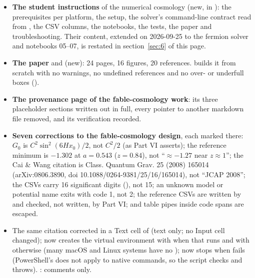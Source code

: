 \begin{itemize}
  \item \textbf{The student instructions} of the numerical cosmology (new, in ): the prerequisites per platform, the setup, the solver's command-line contract read from , the CSV columns, the notebooks, the tests, the paper and troubleshooting. Their content, extended on 2026-09-25 to the fermion solver and notebooks 05--07, is restated in section~\ref{sec:6} of this page.
  \item \textbf{The paper}  and  (new): 24 pages, 16 figures, 20 references.  builds it from scratch with no warnings, no undefined references and no over- or underfull boxes ().
  \item \textbf{The provenance page of the fable-cosmology work}: its three placeholder sections written out in full, every pointer to another markdown file removed, and its verification recorded.
  \item \textbf{Seven corrections to the fable-cosmology design}, each marked \cftt{[corr 2026-{}09-{}24]} there: $G_{0}$ is $C^2\sin^2(6Hx_0)/2$, not $C^{2}/2$ (as Part VI asserts); the reference  minimum is $-1.302$ at $a = 0.543$ ($z = 0.84$), not ``$\approx -1.27$ near $z \approx 1$''; the Cai \& Wang citation is Class. Quantum Grav. 25 (2008) 165014 (arXiv:0806.3890, doi 10.1088/0264-9381/25/16/165014), not ``JCAP 2008''; the CSVs carry 16 significant digits (), not 15; an unknown model or potential name exits with code 1, not 2; the reference CSVs are written by  and checked, not written, by Part VI; and table pipes inside code spans are escaped.
  \item The same citation corrected in a Text cell of  (text only; no Input cell changed);  now creates the virtual environment with  when that runs and with  otherwise (many macOS and Linux systems have no );  now stops when  fails (PowerShell's  does not apply to native commands, so the script checks  and throws). : comments only.
\end{itemize}

